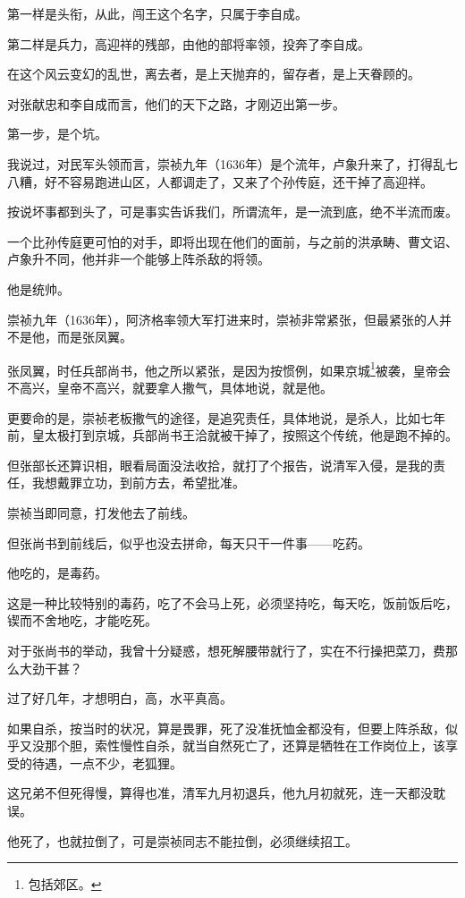 \begin{multicols}{\theparacolNo}
第一样是头衔，从此，闯王这个名字，只属于李自成。

第二样是兵力，高迎祥的残部，由他的部将率领，投奔了李自成。

在这个风云变幻的乱世，离去者，是上天抛弃的，留存者，是上天眷顾的。

对张献忠和李自成而言，他们的天下之路，才刚迈出第一步。

第一步，是个坑。

我说过，对民军头领而言，崇祯九年（1636年）是个流年，卢象升来了，打得乱七八糟，好不容易跑进山区，人都调走了，又来了个孙传庭，还干掉了高迎祥。

按说坏事都到头了，可是事实告诉我们，所谓流年，是一流到底，绝不半流而废。

一个比孙传庭更可怕的对手，即将出现在他们的面前，与之前的洪承畴、曹文诏、卢象升不同，他并非一个能够上阵杀敌的将领。

他是统帅。

崇祯九年（1636年），阿济格率领大军打进来时，崇祯非常紧张，但最紧张的人并不是他，而是张凤翼。

张凤翼，时任兵部尚书，他之所以紧张，是因为按惯例，如果京城\footnote{包括郊区。}被袭，皇帝会不高兴，皇帝不高兴，就要拿人撒气，具体地说，就是他。

更要命的是，崇祯老板撒气的途径，是追究责任，具体地说，是杀人，比如七年前，皇太极打到京城，兵部尚书王洽就被干掉了，按照这个传统，他是跑不掉的。

但张部长还算识相，眼看局面没法收拾，就打了个报告，说清军入侵，是我的责任，我想戴罪立功，到前方去，希望批准。

崇祯当即同意，打发他去了前线。

但张尚书到前线后，似乎也没去拼命，每天只干一件事——吃药。

他吃的，是毒药。

这是一种比较特别的毒药，吃了不会马上死，必须坚持吃，每天吃，饭前饭后吃，锲而不舍地吃，才能吃死。

对于张尚书的举动，我曾十分疑惑，想死解腰带就行了，实在不行操把菜刀，费那么大劲干甚？

过了好几年，才想明白，高，水平真高。

如果自杀，按当时的状况，算是畏罪，死了没准抚恤金都没有，但要上阵杀敌，似乎又没那个胆，索性慢性自杀，就当自然死亡了，还算是牺牲在工作岗位上，该享受的待遇，一点不少，老狐狸。

这兄弟不但死得慢，算得也准，清军九月初退兵，他九月初就死，连一天都没耽误。

他死了，也就拉倒了，可是崇祯同志不能拉倒，必须继续招工。


\end{multicols}
